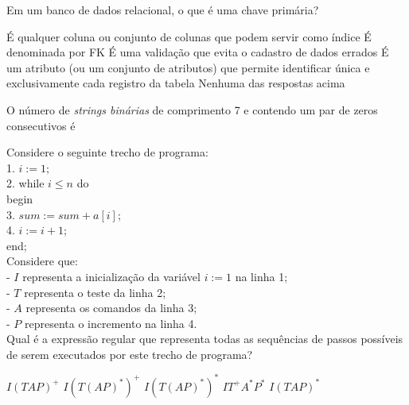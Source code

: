 \documentclass[12pt, addpoints]{exam}
\begin{document}
\begin{questions}
\question

Em um banco de dados relacional, o que é uma chave primária?


\begin{choices}
\choice É qualquer coluna ou conjunto de colunas que podem servir como índice
\choice É denominada por FK
\choice É uma validação que evita o cadastro de dados errados
\choice É um atributo (ou um conjunto de atributos) que permite identificar única e exclusivamente cada registro da tabela
\choice Nenhuma das respostas acima
\end{choices}

\question

O número de \textit{strings binárias} de comprimento 7 e contendo um par de zeros consecutivos é


\begin{choices}
\end{choices}

\question

Considere o seguinte trecho de programa:\\

1. \( i := 1; \)\\

2. while \( i \leq n \) do\\

   begin\\

3. \( sum := sum + a[i]; \)\\

4. \( i := i + 1; \)\\

   end;\\



Considere que:\\

- \( I \) representa a inicialização da variável \( i := 1 \) na linha 1;\\

- \( T \) representa o teste da linha 2;\\

- \( A \) representa os comandos da linha 3;\\

- \( P \) representa o incremento na linha 4.\\



Qual é a expressão regular que representa todas as sequências de passos possíveis de serem executados por este trecho de programa?
\begin{choices}
\choice \( I(TAP)^+ \)
\choice \( I(T(AP)^*)^+ \)
\choice \( I(T(AP)^*)^* \)
\choice \( IT^+A^*P^* \)
\choice \( I(TAP)^* \)
\end{choices}


\end{questions}
\end{document}

